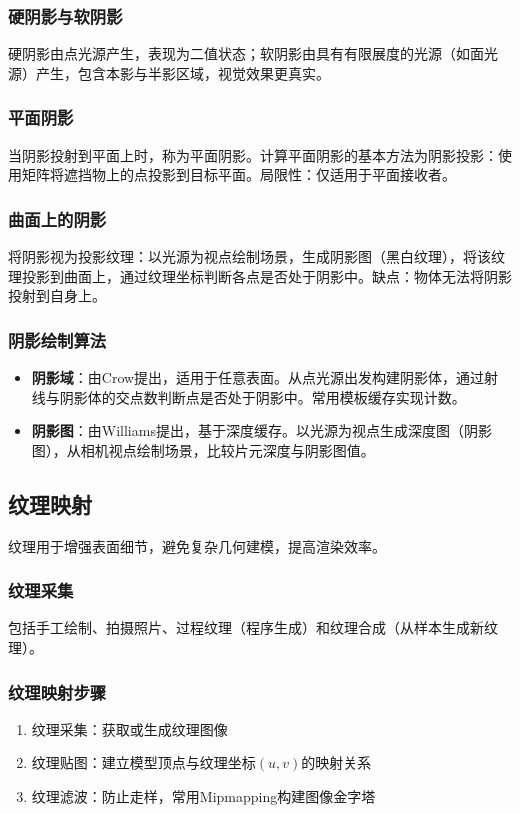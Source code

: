 \documentclass[12pt]{article}
\begin{document}
\subsubsection{硬阴影与软阴影}
硬阴影由点光源产生，表现为二值状态；软阴影由具有有限展度的光源（如面光源）产生，包含本影与半影区域，视觉效果更真实。

\subsubsection{平面阴影}
当阴影投射到平面上时，称为平面阴影。计算平面阴影的基本方法为阴影投影：使用矩阵将遮挡物上的点投影到目标平面。局限性：仅适用于平面接收者。

\subsubsection{曲面上的阴影}
将阴影视为投影纹理：以光源为视点绘制场景，生成阴影图（黑白纹理），将该纹理投影到曲面上，通过纹理坐标判断各点是否处于阴影中。缺点：物体无法将阴影投射到自身上。

\subsubsection{阴影绘制算法}
\begin{itemize}
    \item \textbf{阴影域}：由Crow提出，适用于任意表面。从点光源出发构建阴影体，通过射线与阴影体的交点数判断点是否处于阴影中。常用模板缓存实现计数。
    \item \textbf{阴影图}：由Williams提出，基于深度缓存。以光源为视点生成深度图（阴影图），从相机视点绘制场景，比较片元深度与阴影图值。
\end{itemize}

\subsection{纹理映射}

纹理用于增强表面细节，避免复杂几何建模，提高渲染效率。

\subsubsection{纹理采集}
包括手工绘制、拍摄照片、过程纹理（程序生成）和纹理合成（从样本生成新纹理）。

\subsubsection{纹理映射步骤}
\begin{enumerate}
    \item 纹理采集：获取或生成纹理图像
    \item 纹理贴图：建立模型顶点与纹理坐标$(u, v)$的映射关系
    \item 纹理滤波：防止走样，常用Mipmapping构建图像金字塔
\end{enumerate}
\end{document}
